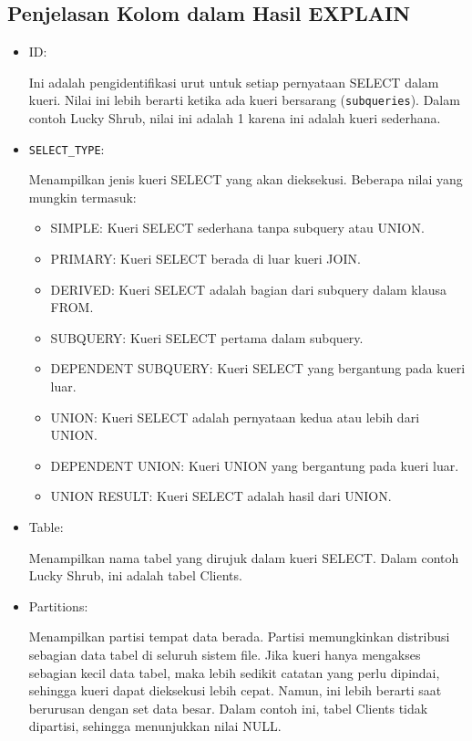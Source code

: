 \documentclass{article}
\begin{document}
\subsection{Penjelasan Kolom dalam Hasil EXPLAIN}
\begin{itemize}
    \item ID:

          Ini adalah pengidentifikasi urut untuk setiap pernyataan SELECT dalam kueri. Nilai ini lebih berarti ketika ada kueri bersarang (\verb|subqueries|). Dalam contoh Lucky Shrub, nilai ini adalah 1 karena ini adalah kueri sederhana.

    \item \verb|SELECT_TYPE|:

          Menampilkan jenis kueri SELECT yang akan dieksekusi. Beberapa nilai yang mungkin termasuk:
          \begin{itemize}
              \item SIMPLE: Kueri SELECT sederhana tanpa subquery atau UNION.
              \item PRIMARY: Kueri SELECT berada di luar kueri JOIN.
              \item DERIVED: Kueri SELECT adalah bagian dari subquery dalam klausa FROM.
              \item SUBQUERY: Kueri SELECT pertama dalam subquery.
              \item DEPENDENT SUBQUERY: Kueri SELECT yang bergantung pada kueri luar.
              \item UNION: Kueri SELECT adalah pernyataan kedua atau lebih dari UNION.
              \item DEPENDENT UNION: Kueri UNION yang bergantung pada kueri luar.
              \item UNION RESULT: Kueri SELECT adalah hasil dari UNION.
          \end{itemize}

    \item Table:

          Menampilkan nama tabel yang dirujuk dalam kueri SELECT. Dalam contoh Lucky Shrub, ini adalah tabel Clients.

    \item Partitions:

          Menampilkan partisi tempat data berada. Partisi memungkinkan distribusi sebagian data tabel di seluruh sistem file. Jika kueri hanya mengakses sebagian kecil data tabel, maka lebih sedikit catatan yang perlu dipindai, sehingga kueri dapat dieksekusi lebih cepat. Namun, ini lebih berarti saat berurusan dengan set data besar. Dalam contoh ini, tabel Clients tidak dipartisi, sehingga menunjukkan nilai NULL.


\end{itemize}
\end{document}
